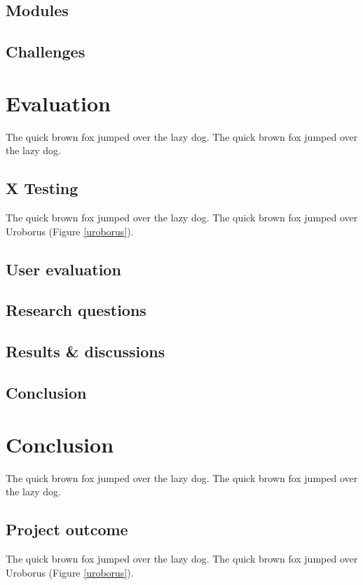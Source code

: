 \documentclass{l4proj}
\begin{document}
\section{Modules}

\section{Challenges}

\chapter{Evaluation}
The quick brown fox jumped over the lazy dog.
The quick brown fox jumped over the lazy dog.

\section{X Testing}
The quick brown fox jumped over the lazy dog.
The quick brown fox jumped over Uroborus (Figure \ref{uroborus}).

\section{User evaluation}

\section{Research questions}

\section{Results & discussions}

\section{Conclusion}

\chapter{Conclusion}
The quick brown fox jumped over the lazy dog.
The quick brown fox jumped over the lazy dog.

\section{Project outcome}
The quick brown fox jumped over the lazy dog.
The quick brown fox jumped over Uroborus (Figure \ref{uroborus}).
\end{document}
